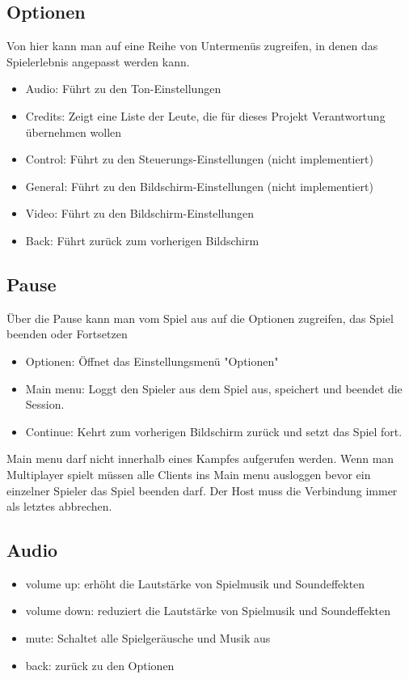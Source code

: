 \documentclass[fontsize=12pt,paper=a4,twoside]{scrartcl}
\begin{document}
\subsection{Optionen}
Von hier kann man auf eine Reihe von Untermenüs zugreifen, in denen das Spielerlebnis angepasst werden kann.
\begin{itemize}
\item Audio: Führt zu den Ton-Einstellungen
\item Credits: Zeigt eine Liste der Leute, die für dieses Projekt Verantwortung übernehmen wollen
\item Control: Führt zu den Steuerungs-Einstellungen (nicht implementiert)
\item General: Führt zu den Bildschirm-Einstellungen (nicht implementiert)
\item Video: Führt zu den Bildschirm-Einstellungen
\item Back: Führt zurück zum vorherigen Bildschirm
\end{itemize}

\subsection{Pause}
Über die Pause kann man vom Spiel aus auf die Optionen zugreifen, das Spiel beenden oder Fortsetzen
\begin{itemize}
\item Optionen: Öffnet das Einstellungsmenü "Optionen"
\item Main menu: Loggt den Spieler aus dem Spiel aus, speichert und beendet die Session.
\item Continue: Kehrt zum vorherigen Bildschirm zurück und setzt das Spiel fort.
\end{itemize}
Main menu darf nicht innerhalb eines Kampfes aufgerufen werden. Wenn man Multiplayer spielt müssen alle Clients ins Main menu ausloggen bevor ein einzelner Spieler das Spiel beenden darf. Der Host muss die Verbindung immer als letztes abbrechen.


\subsection{Audio}
\begin{itemize}
\item volume up: erhöht die Lautstärke von Spielmusik und Soundeffekten
\item volume down: reduziert die Lautstärke von Spielmusik und Soundeffekten
\item mute: Schaltet alle Spielgeräusche und Musik aus
\item back: zurück zu den Optionen
\end{itemize}
\end{document}

